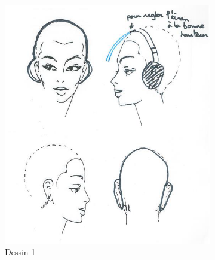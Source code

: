 \begin{figure}%
\centering
\begin{subfigure}{0.32\textwidth}
\includegraphics[width=\columnwidth]{figures/gestes/dessincasque.png}%
\caption{Dessin 1}
\end{subfigure}
\begin{subfigure}{0.32\textwidth}

\end{subfigure}
\end{figure}

